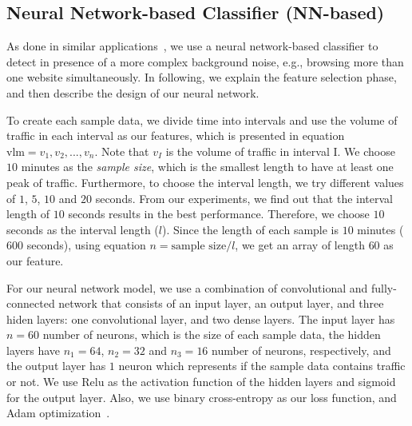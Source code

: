 \subsection{Neural Network-based Classifier (NN-based)}\label{class:nn}
As done in similar applications~\cite{deepcore}, we use a neural network-based classifier to detect \bc in presence of a more complex background noise, e.g., browsing more than one website simultaneously. In following, we explain the feature selection phase, and then describe the design of our neural network.

To create each sample data, we divide time into intervals
and use the volume of traffic in each interval as our features, which is 
presented in equation $\mbox{vlm}=v_1, v_2, ..., v_{n}$. 
Note that $v_I$ is the volume of traffic in interval I. We choose $10$ minutes as the \textit{sample size}, which is the smallest length to have
at least one peak of traffic. Furthermore, to choose the interval
length, we try different values of $1$, $5$, $10$ and $20$ seconds. From our experiments, we find out 
that the interval length of $10$ seconds results in the best performance. Therefore, we choose $10$ 
seconds as the interval length ($l$). 
Since the length of each sample is $10$ minutes 
($600$ seconds), using equation $n=\mbox{sample size}/l$, we get an array of 
length $60$ as our feature.
\iffalse
\begin{equation}\label{eq:v}
 n=\mbox{sample size}/l
\end{equation}
\begin{equation}\label{eq:a}
\mbox{vlm}=v_1, v_2, ..., v_{n}
\end{equation}\fi

For our neural network model, we use a combination of convolutional and fully-connected network that 
consists of an input layer, an output layer, and three hiden layers: one convolutional layer, and two dense layers. The input layer has $n=60$ number of neurons, which is the size of each sample data, the hidden layers have $n_1=64$, $n_2=32$ and $n_3 = 16$ number of neurons, respectively, and the output layer has $1$ neuron which represents if the sample data contains \bc 
traffic or not. We use Relu as the activation function of the hidden layers and 
sigmoid~\cite{deep_learning_book} for the output layer. Also, we use binary cross-entropy as our loss function, and Adam optimization~\cite{adam}.%

